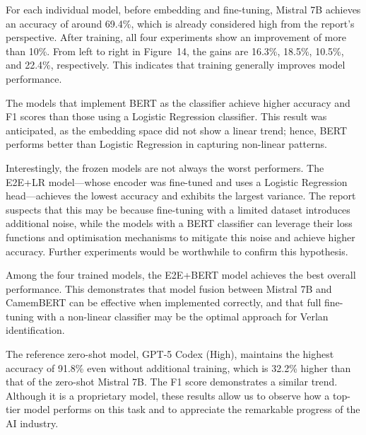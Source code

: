 \documentclass[12pt]{article}
\begin{document}
For each individual model, before embedding and fine-tuning, Mistral 7B achieves an accuracy of around 69.4\%, which is already considered high from the report's perspective. 
After training, all four experiments show an improvement of more than 10\%. 
From left to right in Figure~14, the gains are 16.3\%, 18.5\%, 10.5\%, and 22.4\%, respectively. 
This indicates that training generally improves model performance.

The models that implement BERT as the classifier achieve higher accuracy and F1 scores than those using a Logistic Regression classifier. 
This result was anticipated, as the embedding space did not show a linear trend; hence, BERT performs better than Logistic Regression in capturing non-linear patterns.

Interestingly, the frozen models are not always the worst performers. 
The E2E+LR model\;---\;whose encoder was fine-tuned and uses a Logistic Regression head\;---\;achieves the lowest accuracy and exhibits the largest variance. 
The report suspects that this may be because fine-tuning with a limited dataset introduces additional noise, while the models with a BERT classifier can leverage their loss functions and optimisation mechanisms to mitigate this noise and achieve higher accuracy. 
Further experiments would be worthwhile to confirm this hypothesis.

Among the four trained models, the E2E+BERT model achieves the best overall performance. 
This demonstrates that model fusion between Mistral 7B and CamemBERT can be effective when implemented correctly, and that full fine-tuning with a non-linear classifier may be the optimal approach for Verlan identification.

The reference zero-shot model, GPT-5 Codex (High), maintains the highest accuracy of 91.8\% even without additional training, which is 32.2\% higher than that of the zero-shot Mistral 7B. 
The F1 score demonstrates a similar trend. 
Although it is a proprietary model, these results allow us to observe how a top-tier model performs on this task and to appreciate the remarkable progress of the AI industry.

\subsection{}
\end{document}
